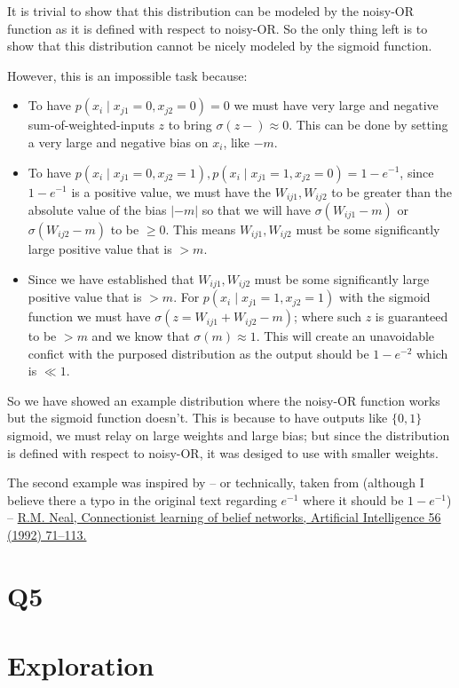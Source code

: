 \documentclass[11pt]{article}
\begin{document}
It is trivial to show that this distribution can be modeled by the noisy-OR function as it is defined with respect to noisy-OR. So the only thing left is to show that this distribution cannot be nicely modeled by the sigmoid function.

However, this is an impossible task because:

\begin{itemize}
    \item To have $p(x_i  \mid x_{j1} = 0, x_{j2} = 0) = 0$ we must have very large and negative sum-of-weighted-inputs $z$ to bring $\sigma(z - \text{}) \approx 0$. This can be done by setting a very large and negative bias on $x_i$, like $-m$.
    \item To have $p(x_i \mid x_{j1} = 0, x_{j2} = 1), p(x_i  \mid x_{j1} = 1, x_{j2} = 0) = 1-e^{-1}$, since $1-e^{-1}$ is a positive value, we must have the $W_{ij1}, W_{ij2}$ to be greater than the absolute value of the bias $|-m|$ so that we will have $\sigma(W_{ij1} - m)$ or $\sigma(W_{ij2} - m)$ to be $\geq 0$. This means $W_{ij1}, W_{ij2}$ must be some significantly large positive value that is $> m$.
    \item Since we have established that $W_{ij1}, W_{ij2}$ must be some significantly large positive value that is $> m$. For $p(x_i \mid x_{j1} = 1, x_{j2} = 1)$ with the sigmoid function we must have $\sigma(z = W_{ij1} + W_{ij2} - m)$; where such $z$ is guaranteed to be $>m$ and we know that $\sigma(m) \approx 1$. This will create an unavoidable confict with the purposed distribution as the output should be $1-e^{-2}$ which is $\ll 1$.
\end{itemize}

So we have showed an example distribution where the noisy-OR function works but the sigmoid function doesn't. This is because to have outputs like $\{0, 1\}$ sigmoid, we must relay on large weights and large bias; but since the distribution is defined with respect to noisy-OR, it was desiged to use with smaller weights.\newline


\noindent The second example was inspired by -- or technically, taken from (although I believe there a typo in the original text regarding $e^{-1}$ where it should be $1 - e^{-1}$) -- \href{http://www.cs.toronto.edu/~bonner/courses/2016s/csc321/readings/Connectionist%20learning%20of%20belief%20networks.pdf}{R.M. Neal, Connectionist learning of belief networks, Artificial Intelligence 56 (1992) 71–113.}


\section*{Q5}

\section*{Exploration}
\end{document}
